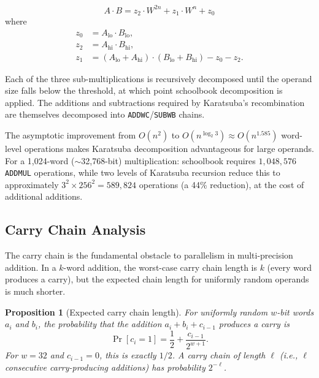 \documentclass[11pt,a4paper]{article}
\newtheorem{proposition}{Proposition}
\begin{document}
\begin{equation}
\label{eq:karatsuba}
A \cdot B = z_2 \cdot W^{2n} + z_1 \cdot W^n + z_0
\end{equation}
where
\begin{align*}
z_0 &= A_{\mathrm{lo}} \cdot B_{\mathrm{lo}}, \\
z_2 &= A_{\mathrm{hi}} \cdot B_{\mathrm{hi}}, \\
z_1 &= (A_{\mathrm{lo}} + A_{\mathrm{hi}}) \cdot (B_{\mathrm{lo}} + B_{\mathrm{hi}}) - z_0 - z_2.
\end{align*}

Each of the three sub-multiplications is recursively decomposed until the
operand size falls below the threshold, at which point schoolbook decomposition
is applied.  The additions and subtractions required by Karatsuba's recombination
are themselves decomposed into \texttt{ADDWC}/\texttt{SUBWB} chains.

The asymptotic improvement from $O(n^2)$ to $O(n^{\log_2 3}) \approx O(n^{1.585})$
word-level operations makes Karatsuba decomposition advantageous for
large operands.  For a 1,024-word ($\sim$32,768-bit) multiplication:
schoolbook requires $1{,}048{,}576$ \texttt{ADDMUL} operations, while
two levels of Karatsuba recursion reduce this to approximately $3^2 \times 256^2
= 589{,}824$ operations (a 44\% reduction), at the cost of additional additions.

\subsection{Carry Chain Analysis}
\label{sec:carry-analysis}

The carry chain is the fundamental obstacle to parallelism in multi-precision
addition.  In a $k$-word addition, the worst-case carry chain length is $k$
(every word produces a carry), but the expected chain length for uniformly
random operands is much shorter.

\begin{proposition}[Expected carry chain length]
\label{prop:carry-chain}
For uniformly random $w$-bit words $a_i$ and $b_i$, the probability that the
addition $a_i + b_i + c_{i-1}$ produces a carry is
\[
  \Pr[c_i = 1] = \frac{1}{2} + \frac{c_{i-1}}{2^{w+1}}.
\]
For $w = 32$ and $c_{i-1} = 0$, this is exactly $1/2$.  A carry chain of
length $\ell$ (i.e., $\ell$ consecutive carry-producing additions) has
probability $2^{-\ell}$.
\end{proposition}
\end{document}
